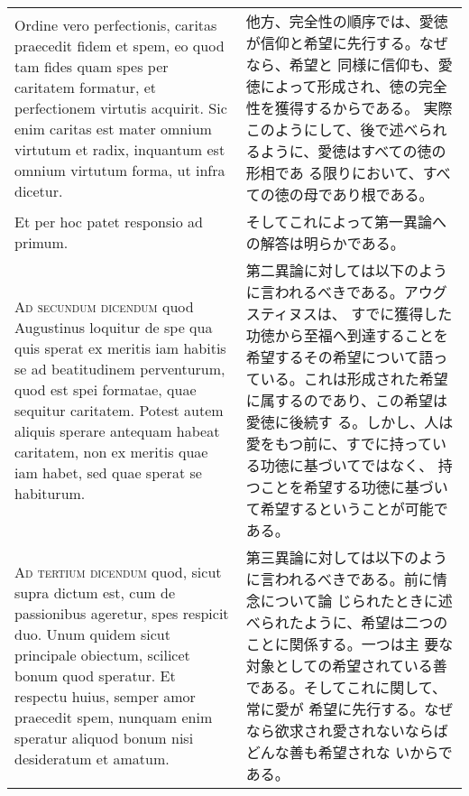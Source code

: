 \documentclass[10pt]{jsarticle}
\begin{document}
\begin{longtable}{p{21em}p{21em}}
 \\

  Ordine vero perfectionis, caritas praecedit fidem et spem, eo quod
 tam fides quam spes per caritatem formatur, et perfectionem virtutis
 acquirit. Sic enim caritas est mater omnium virtutum et radix,
 inquantum est omnium virtutum forma, ut infra dicetur.

&

 他方、完全性の順序では、愛徳が信仰と希望に先行する。なぜなら、希望と
 同様に信仰も、愛徳によって形成され、徳の完全性を獲得するからである。
 実際このようにして、後で述べられるように、愛徳はすべての徳の形相であ
 る限りにおいて、すべての徳の母であり根である。


 \\



Et per hoc patet responsio ad primum.


&

そしてこれによって第一異論への解答は明らかである。

 \\



{\scshape Ad secundum dicendum} quod Augustinus loquitur de spe qua
quis sperat ex meritis iam habitis se ad beatitudinem perventurum,
quod est spei formatae, quae sequitur caritatem. Potest autem aliquis
sperare antequam habeat caritatem, non ex meritis quae iam habet, sed
quae sperat se habiturum.


&

 第二異論に対しては以下のように言われるべきである。アウグスティヌスは、
 すでに獲得した功徳から至福へ到達することを希望するその希望について語っ
 ている。これは形成された希望に属するのであり、この希望は愛徳に後続す
 る。しかし、人は愛をもつ前に、すでに持っている功徳に基づいてではなく、
 持つことを希望する功徳に基づいて希望するということが可能である。


 \\



{\scshape Ad tertium dicendum} quod, sicut supra dictum est, cum de
passionibus ageretur, spes respicit duo. Unum quidem sicut principale
obiectum, scilicet bonum quod speratur. Et respectu huius, semper amor
praecedit spem, nunquam enim speratur aliquod bonum nisi desideratum
et amatum. 


&

 第三異論に対しては以下のように言われるべきである。前に情念について論
 じられたときに述べられたように、希望は二つのことに関係する。一つは主
 要な対象としての希望されている善である。そしてこれに関して、常に愛が
 希望に先行する。なぜなら欲求され愛されないならばどんな善も希望されな
 いからである。


\end{longtable}
\end{document}
